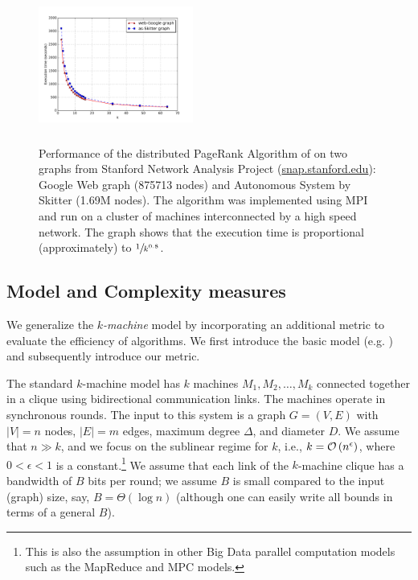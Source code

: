 \begin{figure}[t]
    \centering
    \scriptsize
    \includegraphics[height=2in,width=2in]{diag}
    \vspace{-0.25in}
    \caption{\scriptsize Performance of the distributed PageRank Algorithm of
	\cite{KlauckNPR15} on two graphs from Stanford Network Analysis Project
	(\url{snap.stanford.edu}): Google Web graph (875713 nodes) and Autonomous
	System by Skitter (1.69M nodes). The algorithm was implemented using MPI and
	run on a cluster of machines interconnected by a high speed network. The
	graph shows that the execution time is proportional (approximately) to
	$\sfrac{1}{k^{0.8}}$.}\label{fig:pr}
\end{figure}

\subsection{Model and Complexity measures}\label{sec:model}
We generalize the \emph{\(k\)-machine} model by incorporating an additional
metric to evaluate the efficiency of algorithms. We first introduce the basic
model (e.g. \cite{KlauckNPR15}) and subsequently introduce our metric.

The standard \(k\)-machine model has \(k\) machines \(M_1, M_2, \hdots, M_k\)
connected together in a clique using bidirectional communication links. The
machines operate in synchronous rounds. The input to this system is a graph
\(G = (V,E)\) with \(|V| = n\) nodes, \(|E| = m\) edges, maximum degree
\(\Delta\), and diameter \(D\). We assume that $n \gg k$, and we focus on the
sublinear regime for $k$, i.e., $k = \mathcal{O}\left(n^{\epsilon}\right)$, where $0 < \epsilon < 1$
is a constant.\footnote{This is also the assumption in other Big Data parallel
computation models such as the MapReduce and MPC models\cite{soda-mapreduce,MPC}.} 
We assume that each link of the $k$-machine clique has a bandwidth of $B$ bits
per round; we assume $B$ is small compared to the input (graph) size, say,
$B = \Theta(\log n)$ (although one can easily write all bounds in terms of a
general $B$). 

